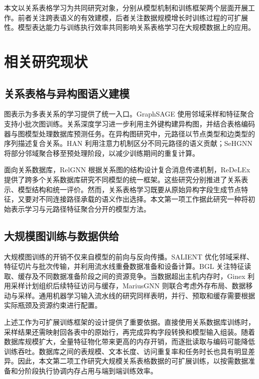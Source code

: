 本文以关系表格学习为共同研究对象，分别从模型机制和训练框架两个层面开展工作。前者关注跨表语义的有效建模，后者关注数据规模增长时训练过程的可扩展性。模型表达能力与训练执行效率共同影响关系表格学习在大规模数据上的应用。

\section{相关研究现状}

\subsection{关系表格与异构图语义建模}

图表示为多表关系的学习提供了统一入口。GraphSAGE 使用邻域采样和特征聚合支持小批次图训练\cite{hamilton2017graphsage}。关系深度学习进一步利用主外键构建异构图，并结合表格编码器与图模型处理数据库预测任务\cite{fey2024rdl}。在异构图研究中，元路径以节点类型和边类型的序列描述复合关系。HAN 利用注意力机制区分不同元路径的语义贡献\cite{wang2019han}；SeHGNN 将部分邻域聚合移至预处理阶段，以减少训练期间的重复计算\cite{yang2023sehgnn}。

面向关系数据库，RelGNN 根据关系图的结构设计复合消息传递机制\cite{chen2025relgnn}，ReDeLEx 提供了跨多个关系数据库研究不同模型的统一框架\cite{peleska2025redelex}。这些研究分别推进了关系表示、模型结构和统一评价。然而，关系表格学习既要从原始异构字段生成节点特征，又要对不同连接路径承载的语义作出选择。本文第一项工作据此研究一种将初始表示学习与元路径特征聚合分开的模型方法。

\subsection{大规模图训练与数据供给}

大规模图训练的开销不仅来自模型的前向与反向传播。SALIENT 优化邻域采样、特征切片与批次传输，并利用流水线重叠数据准备和设备计算\cite{kaler2022salient}。BGL 关注特征读取、缓存及不同数据准备阶段之间的资源竞争\cite{liu2023bgl}。当数据超出主机内存时，Ginex 利用采样计划组织后续特征访问与缓存\cite{park2022ginex}，MariusGNN 则联合考虑外存布局、数据移动与采样\cite{waleffe2023mariusgnn}。通用机器学习输入流水线的研究同样表明，并行、预取和缓存需要根据实际瓶颈及资源约束进行配置\cite{kuchnik2022plumber}。

上述工作为可扩展训练框架的设计提供了重要依据。直接使用关系数据库训练时，采样结果还需映射回各表中的原始行，再完成异构字段转换和模型输入组装。随着数据库规模扩大，全量特征物化带来更高的内存开销，而逐批读取与编码可能降低训练吞吐。数据库之间的表规模、文本长度、访问重复率和任务时长也具有明显差异。因此，本文第二项工作研究大规模关系表格数据的可扩展训练，以按需数据准备和分阶段执行协调内存占用与端到端训练效率。

